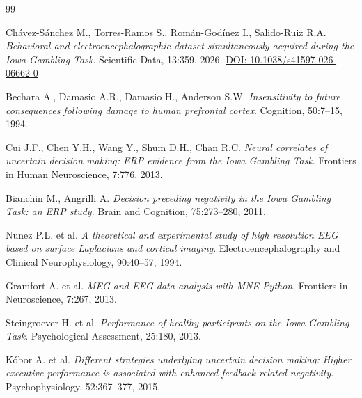 \documentclass[12pt, a4paper]{article}
\begin{document}
\newpage
\begin{thebibliography}{99}

Chávez-Sánchez M., Torres-Ramos S., Román-Godínez I., Salido-Ruiz R.A.
\textit{Behavioral and electroencephalographic dataset simultaneously acquired during the Iowa Gambling Task}.
Scientific Data, 13:359, 2026.
\href{https://doi.org/10.1038/s41597-026-06662-0}{DOI: 10.1038/s41597-026-06662-0}

Bechara A., Damasio A.R., Damasio H., Anderson S.W.
\textit{Insensitivity to future consequences following damage to human prefrontal cortex}.
Cognition, 50:7--15, 1994.

Cui J.F., Chen Y.H., Wang Y., Shum D.H., Chan R.C.
\textit{Neural correlates of uncertain decision making: ERP evidence from the Iowa Gambling Task}.
Frontiers in Human Neuroscience, 7:776, 2013.

Bianchin M., Angrilli A.
\textit{Decision preceding negativity in the Iowa Gambling Task: an ERP study}.
Brain and Cognition, 75:273--280, 2011.

Nunez P.L. et al.
\textit{A theoretical and experimental study of high resolution EEG based on surface Laplacians and cortical imaging}.
Electroencephalography and Clinical Neurophysiology, 90:40--57, 1994.

Gramfort A. et al.
\textit{MEG and EEG data analysis with MNE-Python}.
Frontiers in Neuroscience, 7:267, 2013.

Steingroever H. et al.
\textit{Performance of healthy participants on the Iowa Gambling Task}.
Psychological Assessment, 25:180, 2013.

Kóbor A. et al.
\textit{Different strategies underlying uncertain decision making: Higher executive performance is associated with enhanced feedback-related negativity}.
Psychophysiology, 52:367--377, 2015.

\end{thebibliography}
\end{document}
